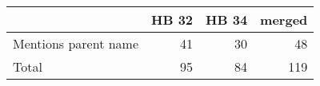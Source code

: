 \begin{tabular}{lrrr}
\toprule
 & HB 32 & HB 34 & merged \\
\midrule
Mentions parent name & 41 & 30 & 48 \\
Total & 95 & 84 & 119 \\
\bottomrule
\end{tabular}
